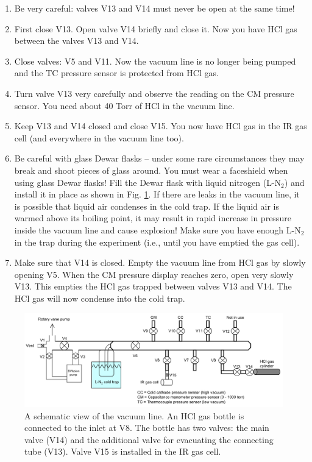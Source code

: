 \documentclass[byrevtex,amssymb,aps,pra,floatfix,letterpaper]{revtex4}
\begin{document}
\begin{enumerate}
\item Be very careful: valves V13 and V14 must never be open at the same time!

\item First close V13. Open valve V14 briefly and close it. Now you have HCl gas between the valves V13 and V14.

\item Close valves: V5 and V11. Now the vacuum line is no longer being pumped and the TC pressure sensor is protected from HCl gas.

\item Turn valve V13 very carefully and observe the reading on the CM pressure sensor. You need about 40 Torr of HCl in the vacuum line.

\item Keep V13 and V14 closed and close V15. You now have HCl gas in the IR gas cell (and everywhere in the vacuum line too).

\item Be careful with glass Dewar flasks -- under some rare circumstances they may break and shoot pieces of glass around. You must wear a faceshield when using glass Dewar flasks! Fill the Dewar flask with liquid nitrogen (L-N$_2$) and install it in place as shown in Fig. \ref{fig5}. If there are leaks in the vacuum line, it is possible that liquid air condenses in the cold trap. If the liquid air is warmed above its boiling point, it may result in rapid increase in pressure inside the vacuum line and cause explosion! Make sure you have enough L-N$_2$ in the trap during the experiment (i.e., until you have emptied the gas cell).

\item Make sure that V14 is closed. Empty the vacuum line from HCl gas by slowly opening V5. When the CM pressure display reaches zero, open very slowly V13. This
empties the HCl gas trapped between valves V13 and V14. The HCl gas will now condense into the cold trap.

\end{enumerate}

\begin{figure}[!htp]
\begin{center}
\includegraphics[scale=0.6]{fig5}
\caption{A schematic view of the vacuum line. An HCl gas bottle is connected to the inlet at V8. The bottle has two valves: the main valve (V14) and the additional valve for evacuating the connecting tube (V13). Valve V15 is installed in the IR gas cell.}
\label{fig5}
\end{center}
\end{figure}
\end{document}
